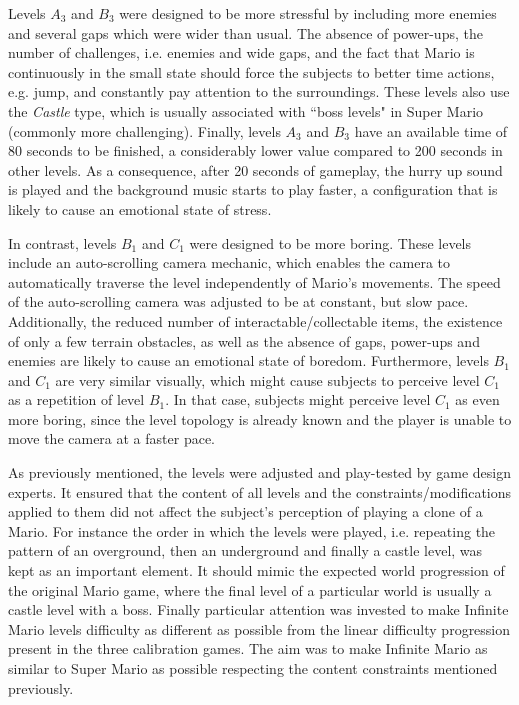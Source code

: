 Levels $A_3$ and $B_3$ were designed to be more stressful by including more enemies and several gaps which were wider than usual. The absence of power-ups, the number of challenges, i.e. enemies and wide gaps, and the fact that Mario is continuously in the small state should force the subjects to better time actions, e.g. jump, and constantly pay attention to the surroundings. These levels also use the \textit{Castle} type, which is usually associated with ``boss levels" in Super Mario (commonly more challenging). Finally, levels $A_3$ and $B_3$ have an available time of 80 seconds to be finished, a considerably lower value compared to 200 seconds in other levels. As a consequence, after 20 seconds of gameplay, the hurry up sound is played and the background music starts to play faster, a configuration that is likely to cause an emotional state of stress.

In contrast, levels $B_1$ and $C_1$ were designed to be more boring. These levels include an auto-scrolling camera mechanic, which enables the camera to automatically traverse the level independently of Mario's movements. The speed of the auto-scrolling camera was adjusted to be at constant, but slow pace. Additionally, the reduced number of interactable/collectable items, the existence of only a few terrain obstacles, as well as the absence of gaps, power-ups and enemies are likely to cause an emotional state of boredom. Furthermore, levels $B_1$ and $C_1$ are very similar visually, which might cause subjects to perceive level $C_1$ as a repetition of level $B_1$. In that case, subjects might perceive level $C_1$ as even more boring, since the level topology is already known and the player is unable to move the camera at a faster pace.

As previously mentioned, the levels were adjusted and play-tested by game design experts. It ensured that the content of all levels and the constraints/modifications applied to them did not affect the subject's perception of playing a clone of a Mario. For instance the order in which the levels were played, i.e. repeating the pattern of an overground, then an underground and finally a castle level, was kept as an important element. It should mimic the expected world progression of the original Mario game, where the final level of a particular world is usually a castle level with a boss. Finally particular attention was invested to make Infinite Mario levels difficulty as different as possible from the linear difficulty progression present in the three calibration games. The aim was to make Infinite Mario as similar to Super Mario as possible respecting the content constraints mentioned previously.

